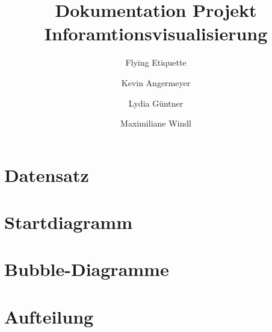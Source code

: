 \documentclass{scrartcl}
\title{Dokumentation Projekt Inforamtionsvisualisierung}
\subtitle{Flying Etiquette}
\author{Kevin Angermeyer \\ \and Lydia Güntner \\ \and Maximiliane Windl}
\begin{document}
\maketitle
\section{Datensatz}

\section{Startdiagramm}

\section{Bubble-Diagramme}

\section{Aufteilung}
\end{document}
